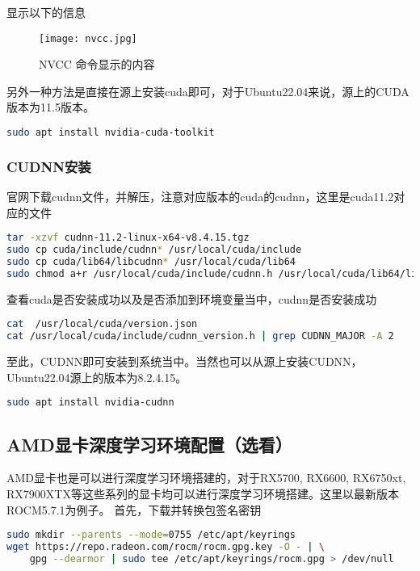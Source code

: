 \documentclass[lang=cn,a4paper,newtx]{elegantpaper}
\begin{document}
显示以下的信息

\begin{figure}[hbpt]
  \centering
  \texttt{[image: nvcc.jpg]}
  \caption{NVCC 命令显示的内容}
  \label{fig:ubuntu-nvcc}
\end{figure}

另外一种方法是直接在源上安装cuda即可，对于Ubuntu22.04来说，源上的CUDA版本为11.5版本。
\begin{lstlisting}[language=bash]
sudo apt install nvidia-cuda-toolkit
\end{lstlisting}

\subsubsection{CUDNN安装}
官网下载cudnn文件，并解压，注意对应版本的cuda的cudnn，这里是cuda11.2对应的文件
\begin{lstlisting}[language=bash]
tar -xzvf cudnn-11.2-linux-x64-v8.4.15.tgz
sudo cp cuda/include/cudnn* /usr/local/cuda/include
sudo cp cuda/lib64/libcudnn* /usr/local/cuda/lib64
sudo chmod a+r /usr/local/cuda/include/cudnn.h /usr/local/cuda/lib64/libcudnn*
\end{lstlisting}

查看cuda是否安装成功以及是否添加到环境变量当中，cudnn是否安装成功
\begin{lstlisting}[language=bash]
cat  /usr/local/cuda/version.json
cat /usr/local/cuda/include/cudnn_version.h | grep CUDNN_MAJOR -A 2
\end{lstlisting}

至此，CUDNN即可安装到系统当中。当然也可以从源上安装CUDNN，Ubuntu22.04源上的版本为8.2.4.15。
\begin{lstlisting}[language=bash]
sudo apt install nvidia-cudnn
\end{lstlisting}

\subsection{AMD显卡深度学习环境配置（选看）}
AMD显卡也是可以进行深度学习环境搭建的，对于RX5700, RX6600, RX6750xt, RX7900XTX等这些系列的显卡均可以进行深度学习环境搭建。这里以最新版本ROCM5.7.1为例子。
首先，下载并转换包签名密钥
\begin{lstlisting}[language=bash]
sudo mkdir --parents --mode=0755 /etc/apt/keyrings
wget https://repo.radeon.com/rocm/rocm.gpg.key -O - | \
    gpg --dearmor | sudo tee /etc/apt/keyrings/rocm.gpg > /dev/null
\end{lstlisting}
\end{document}
